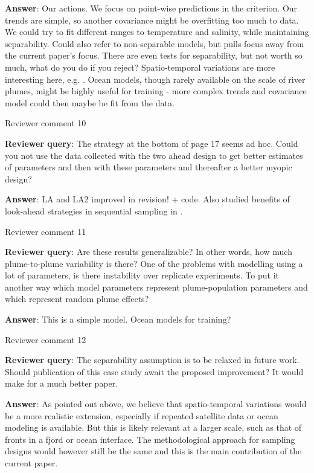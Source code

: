 \documentclass[a4paper]{article}
\def\reply{\textbf{Reviewer query}}
\def\action{\textbf{Answer}}
\begin{document}
\begin{answers}
\action: Our actions. We focus on point-wise predictions in the criterion. Our trends are simple, so another covariance might be overfitting too much to data. We could try to fit different ranges to temperature and salinity, while maintaining separability. Could also refer to non-separable models, but pulls focus away from the current paper's focus. There are even tests for separability, but not worth so much, what do you do if you reject? Spatio-temporal variations are more interesting here, e.g. \cite{sigrist2015stochastic,richardson2017sparsity}. Ocean models, though rarely available on the scale of river plumes, might be highly useful for training - more complex trends and covariance model could then maybe be fit from the data. 

\item{Reviewer comment 10}\label{r1c10}

\reply: The strategy at the bottom of page 17 seems ad hoc. Could you not use the data collected with the two ahead design to get better estimates of parameters and then with these parameters and thereafter a better myopic design?

\action: LA and LA2 improved in revision! + code. Also studied benefits of look-ahead strategies in sequential sampling in \cite{martinelli2013dynamic}.

\item{Reviewer comment 11}\label{r1c11}

\reply: Are these results generalizable? In other words, how much plume-to-plume variability is there? One of the problems with modelling using a lot of parameters, is there instability over replicate experiments. To put it another way which model parameters represent plume-population parameters and which represent random plume effects?

\action: This is a simple model. Ocean models for training? 

\item{Reviewer comment 12}\label{r1c12}

\reply: The separability assumption is to be relaxed in future work. Should publication of this case study await the proposed improvement? It would make for a much better paper.

\action: As pointed out above, we believe that spatio-temporal variations would be a more realistic extension, especially if repeated satellite data or ocean modeling is available. But this is likely relevant at a larger scale, such as that of fronts in a fjord or ocean interface. The methodological approach for sampling designs would however still be the same and this is the main contribution of the current paper. 


\end{answers}
\end{document}
